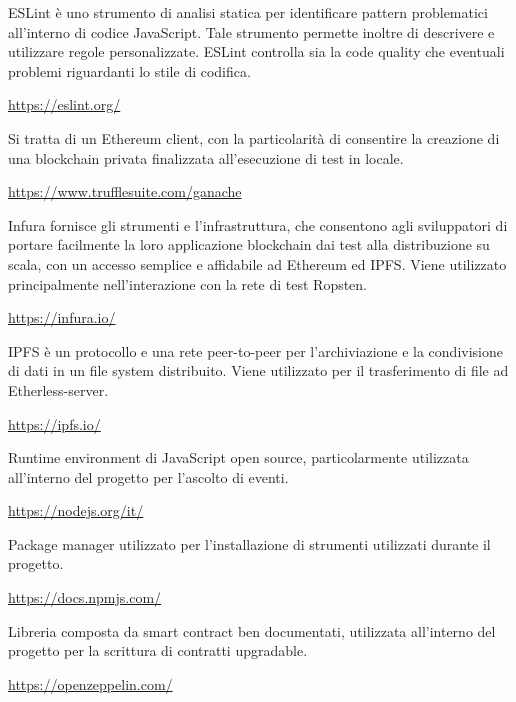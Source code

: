 	ESLint è uno strumento di analisi statica per identificare pattern problematici all'interno di codice JavaScript. Tale strumento permette inoltre di descrivere e utilizzare regole personalizzate. ESLint controlla sia la code quality che eventuali problemi riguardanti lo stile di codifica.
	\begin{center}
		\url{https://eslint.org/}
	\end{center}

	Si tratta di un Ethereum client, con la particolarità di consentire la creazione di una blockchain privata finalizzata all'esecuzione di test in locale.
	\begin{center}
		\url{https://www.trufflesuite.com/ganache}
	\end{center}

	Infura fornisce gli strumenti e l'infrastruttura, che consentono agli sviluppatori di portare facilmente la loro applicazione blockchain dai test alla distribuzione su scala, con un accesso semplice e affidabile ad Ethereum ed IPFS. Viene utilizzato principalmente nell'interazione con la rete di test Ropsten.
	\begin{center}
		\url{https://infura.io/}
	\end{center}

	IPFS è un protocollo e una rete peer-to-peer per l'archiviazione e la condivisione di dati in un file system distribuito. Viene utilizzato per il trasferimento di file ad Etherless-server.
	\begin{center}
		\url{https://ipfs.io/}
	\end{center}

	Runtime environment di JavaScript open source, particolarmente utilizzata all'interno del progetto per l'ascolto di eventi.
	\begin{center}
		\url{https://nodejs.org/it/}
	\end{center}

	Package manager utilizzato per l'installazione di strumenti utilizzati durante il progetto.
	\begin{center}
		\url{https://docs.npmjs.com/}
	\end{center}

	Libreria composta da smart contract ben documentati, utilizzata all'interno del progetto per la scrittura di contratti upgradable.
	\begin{center}
		\url{https://openzeppelin.com/}
	\end{center}

